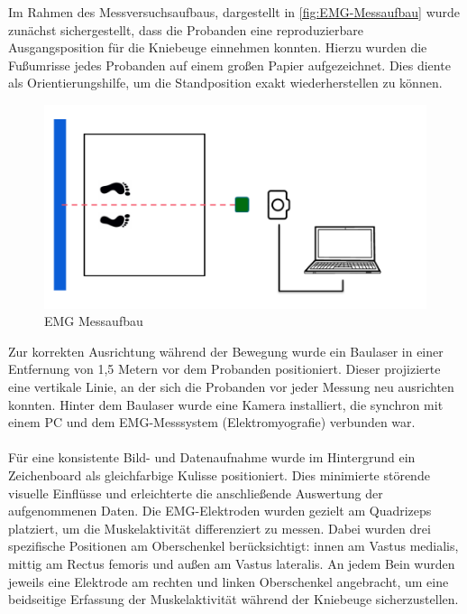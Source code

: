 Im Rahmen des Messversuchsaufbaus, dargestellt in \autoref{fig:EMG-Messaufbau} wurde zunächst sichergestellt, dass die Probanden eine reproduzierbare Ausgangsposition für die Kniebeuge einnehmen konnten.
Hierzu wurden die Fußumrisse jedes Probanden auf einem großen Papier aufgezeichnet.
Dies diente als Orientierungshilfe, um die Standposition exakt wiederherstellen zu können.
\begin{figure}[h!]
    \centering
    \includegraphics[width=0.8\linewidth]{img/Aufbau-EMG.png}
    \caption{EMG Messaufbau}
    \label{fig:EMG-Messaufbau}
\end{figure}
Zur korrekten Ausrichtung während der Bewegung wurde ein Baulaser in einer Entfernung von 1,5 Metern vor dem Probanden positioniert.
Dieser projizierte eine vertikale Linie, an der sich die Probanden vor jeder Messung neu ausrichten konnten.
Hinter dem Baulaser wurde eine Kamera installiert, die synchron mit einem PC und dem EMG-Messsystem (Elektromyografie) verbunden war.\\
\\
Für eine konsistente Bild- und Datenaufnahme wurde im Hintergrund ein Zeichenboard als gleichfarbige Kulisse positioniert. Dies minimierte störende visuelle Einflüsse und erleichterte die anschließende Auswertung der aufgenommenen Daten.
Die EMG-Elektroden wurden gezielt am Quadrizeps platziert, um die Muskelaktivität differenziert zu messen.
Dabei wurden drei spezifische Positionen am Oberschenkel berücksichtigt: innen am Vastus medialis, mittig am Rectus femoris und außen am Vastus lateralis.
An jedem Bein wurden jeweils eine Elektrode am rechten und linken Oberschenkel angebracht, um eine beidseitige Erfassung der Muskelaktivität während der Kniebeuge sicherzustellen.

